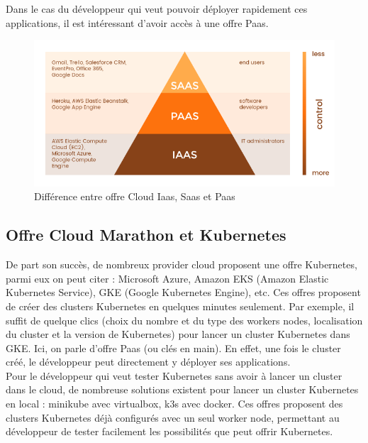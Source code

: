 \documentclass[11pt,fleqn]{book} %
\begin{document}
Dans le cas du développeur qui veut pouvoir déployer rapidement ces applications, il est intéressant d'avoir accès à une offre Paas.
\newpage

\begin{figure}[H]\centering
\renewcommand{\figurename}{Schéma}
\includegraphics[scale=0.6]{Pictures/Comparaison/cloud/difference-cloud.png}
\captionsetup{margin=1.5cm,format=hang,justification=justified}
\caption[]{Différence entre offre Cloud Iaas, Saas et Paas \newline}
\end{figure}

\subsection*{Offre Cloud Marathon et Kubernetes}
De part son succès, de nombreux provider cloud proposent une offre Kubernetes, parmi eux on peut citer : Microsoft Azure, Amazon EKS (Amazon Elastic Kubernetes Service), GKE (Google Kubernetes Engine), etc. Ces offres proposent de créer des clusters Kubernetes en quelques minutes seulement. Par exemple, il suffit de quelque clics (choix du nombre et du type des workers nodes, localisation du cluster et la version de Kubernetes) pour lancer un cluster Kubernetes dans GKE. Ici, on parle d'offre Paas (ou clés en main). En effet, une fois le cluster créé, le développeur peut directement y déployer ses applications.\\

Pour le développeur qui veut tester Kubernetes sans avoir à lancer un cluster dans le cloud, de nombreuse solutions existent pour lancer un cluster Kubernetes en local : minikube avec virtualbox, k3s avec docker. Ces offres proposent des clusters Kubernetes déjà configurés avec un seul worker node, permettant au développeur de tester facilement les possibilités que peut offrir Kubernetes.\\
\end{document}
